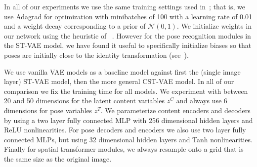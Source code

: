 \label{sec:eval}
\vspace{-2mm}

In all of our experiments we use the same training settings used in~\cite{Kingma2014}; that is,  
we use Adagrad for optimization with minibatches of 100  with a learning rate of 0.01
and a weight decay corresponding to a prior of $\mathcal{N}(0,1)$.
We initialize weights in our network using the heuristic of ~\cite{glorot2010understanding}.
However for the pose recognition modules in the ST-VAE model, we have found it useful to
specifically initialize biases so that poses are initially close to the identity transformation (see~\cite{jaderberg2015spatial}).

We use vanilla VAE models  as a baseline model against first the (single image layer) ST-VAE
model, then the more general CST-VAE model.  In all of our comparison we fix the training time for all models.
We experiment with between 20 and 50  dimensions for the latent content variables $z^C$
and always use 6 dimensions for pose variables $z^T$.
We parameterize content encoders and decoders
by using a two layer fully connected MLP with 256 dimensional
hidden layers and ReLU nonlinearities.
For pose decoders and encoders we also use two layer fully connected MLPs, but 
using 32 dimensional hidden layers and Tanh nonlinearities.
%
Finally for spatial transformer modules, we always resample onto a grid that is the same size as the original
image.



